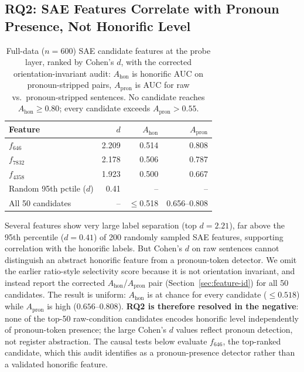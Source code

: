 \documentclass[11pt]{article}
\begin{document}
\subsection{RQ2: SAE Features Correlate with Pronoun Presence, Not Honorific Level}
\label{sec:rq2-results}

\begin{table}[t]
\centering
\small
\setlength\tabcolsep{4pt}
\begin{tabular}{lrrr}
\toprule
\textbf{Feature} & \textbf{$d$} & $A_{\mathrm{hon}}$ & $A_{\mathrm{pron}}$ \\
\midrule
$f_{646}$   & 2.209 & 0.514 & 0.808 \\
$f_{7832}$  & 2.178 & 0.506 & 0.787 \\
$f_{4358}$  & 1.923 & 0.500 & 0.667 \\
\midrule
Random 95th pctile ($d$) & 0.41 & -- & -- \\
All 50 candidates & -- & $\leq$0.518 & 0.656--0.808 \\
\bottomrule
\end{tabular}
\caption{Full-data ($n{=}600$) SAE candidate features at the probe layer,
  ranked by Cohen's $d$, with the corrected orientation-invariant audit:
  $A_{\mathrm{hon}}$ is honorific AUC on pronoun-stripped pairs,
  $A_{\mathrm{pron}}$ is AUC for raw vs.\ pronoun-stripped sentences. No
  candidate reaches $A_{\mathrm{hon}}\geq0.80$; every candidate exceeds
  $A_{\mathrm{pron}}>0.55$.}
\label{tab:features}
\end{table}

Several features show very large label separation (top $d=2.21$), far above the
95th percentile ($d=0.41$) of 200 randomly sampled SAE features, supporting
correlation with the honorific labels. But Cohen's $d$ on raw sentences cannot
distinguish an abstract honorific feature from a pronoun-token detector. We
omit the earlier ratio-style selectivity score because it is not orientation
invariant, and instead report the corrected $A_{\mathrm{hon}}$/$A_{\mathrm{pron}}$
pair (Section~\ref{sec:feature-id}) for all 50 candidates. The result is
uniform: $A_{\mathrm{hon}}$ is at chance for every candidate ($\leq0.518$) while
$A_{\mathrm{pron}}$ is high ($0.656$--$0.808$). \textbf{RQ2 is therefore
resolved in the negative}: none of the top-50 raw-condition candidates encodes
honorific level independently of pronoun-token presence; the large Cohen's $d$
values reflect pronoun detection, not register abstraction. The causal tests
below evaluate $f_{646}$, the top-ranked candidate, which this audit identifies
as a pronoun-presence detector rather than a validated honorific feature.
\end{document}
